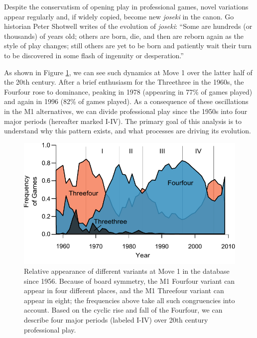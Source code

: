Despite the conservatism of opening play in professional games, novel variations appear regularly and, if widely copied, become new \textit{joseki} in the canon.  Go historian Peter Shotwell writes of the evolution of \textit{joseki}: ``Some are hundreds (or thousands) of years old; others are born, die, and then are reborn again as the style of play changes; still others are yet to be born and patiently wait their turn to be discovered in some flash of ingenuity or desperation.'' \citep{Shotwell2003}

As shown in Figure \ref{fig:M1Freqs}, we can see such dynamics at Move 1 over the latter half of the 20th century.  After a brief enthusiasm for the Threethree in the 1960s, the Fourfour rose to dominance, peaking in 1978 (appearing in 77\% of games played) and again in 1996 (82\% of games played).  As a consequence of these oscillations in the M1 alternatives, we can divide professional play since the 1950s into four major periods (hereafter marked I-IV).  The primary goal of this analysis is to understand why this pattern exists, and what processes are driving its evolution.


\begin{figure}[t]
\begin{center} 
\includegraphics[scale=1.0]{figures/gofirstmove/figM1Freqs.pdf}
\caption{Relative appearance of different variants at Move 1 in the database since 1956.  Because of board symmetry, the M1 Fourfour variant can appear in four different places, and the M1 Threefour variant can appear in eight; the frequencies above take all such congruencies into account.  Based on the cyclic rise and fall of the Fourfour, we can describe four major periods (labeled I-IV) over 20th century professional play.}
\label{fig:M1Freqs}
\end{center}
\end{figure} 
 
